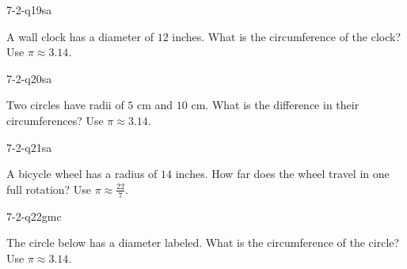 \begin{practiceQuestion}{7-2-q19}{sa}
\begin{questionText}
A wall clock has a diameter of $12$ inches. What is the circumference of the clock? Use $\pi \approx 3.14$.
\end{questionText}
\end{practiceQuestion}

\begin{practiceQuestion}{7-2-q20}{sa}
\begin{questionText}
Two circles have radii of $5$ cm and $10$ cm. What is the difference in their circumferences? Use $\pi \approx 3.14$.
\end{questionText}
\end{practiceQuestion}

\begin{practiceQuestion}{7-2-q21}{sa}
\begin{questionText}
A bicycle wheel has a radius of $14$ inches. How far does the wheel travel in one full rotation? Use $\pi \approx \frac{22}{7}$.
\end{questionText}
\end{practiceQuestion}


\begin{practiceQuestion}{7-2-q22}{gmc}
\begin{questionText}
The circle below has a diameter labeled. What is the circumference of the circle? Use $\pi \approx 3.14$.

\begin{center}
\end{center}
\end{questionText}
\end{practiceQuestion}

